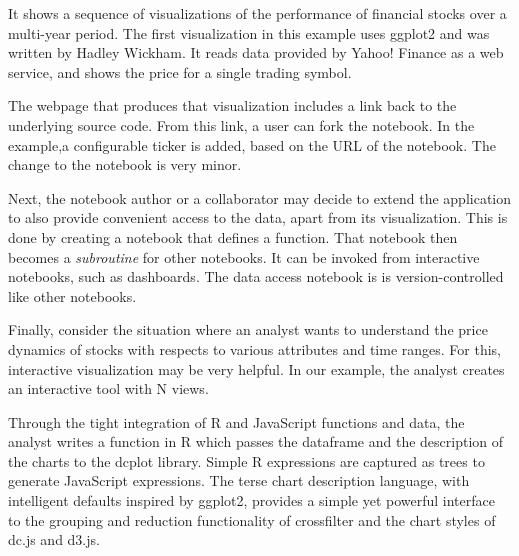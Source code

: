 It shows a sequence of visualizations of the performance
of financial stocks over a multi-year period. The first visualization
in this example uses ggplot2 and was written by Hadley Wickham.
It reads data provided by Yahoo! Finance as a web service, and shows
the price for a single trading symbol.

The webpage that produces that visualization includes a link back to
the underlying source code. From this link, a user can fork the notebook.
In the example,a configurable ticker is added, based on the URL of
the notebook. The change to the notebook is very minor.

Next, the notebook author or a collaborator may decide to extend
the application to also provide convenient access to the data,
apart from its visualization.
This is done by creating a notebook that defines a function.
That notebook then becomes a \emph{subroutine} for other notebooks.
It can be invoked from interactive notebooks, such as dashboards.
The data access notebook is is version-controlled like other notebooks.

Finally, consider the situation where an analyst wants to understand
the price dynamics of stocks with respects to various attributes and
time ranges. For this, interactive visualization may be very helpful.
In our example, the analyst creates an interactive tool with N views.

Through the tight integration of R and JavaScript functions and data,
the analyst writes a function in R which passes the dataframe and the
description of the charts to the dcplot library.  Simple R expressions
are captured as trees to generate JavaScript expressions.  The terse
chart description language, with intelligent defaults inspired by
ggplot2, provides a simple yet powerful interface to the grouping
and reduction functionality of crossfilter and the chart styles of
dc.js and d3.js.


%
